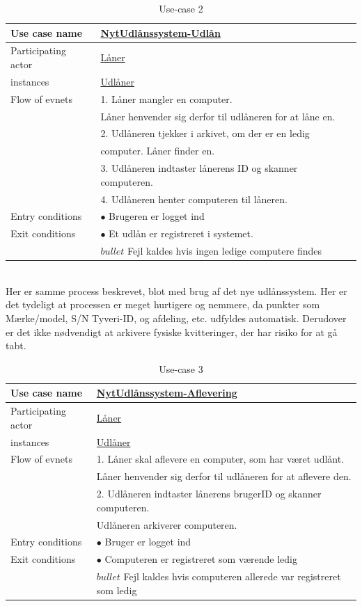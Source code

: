 \documentclass[a4paper]{article}
\begin{document}
\begin{table}[h]
\caption{Use-case 2}
\begin{tabular}{ll}
Use case name             & \underline{NytUdlånssystem-Udlån} \\ \hline
Participating actor           & \underline{Låner} \\
instances                     & \underline{Udlåner}\\ \hline
Flow of evnets                & 1. Låner mangler en computer.	\\& Låner henvender sig derfor til udlåneren for at låne en.
\\& 2. Udlåneren tjekker i arkivet, om der er en ledig \\& computer. Låner finder en.
\\& 3. Udlåneren indtaster lånerens ID og skanner computeren.
\\& 4. Udlåneren henter computeren til låneren.\\ \hline
Entry conditions & $\bullet$ Brugeren er logget ind \\ \hline
Exit conditions  & $\bullet$ Et udlån er registreret i systemet.\\
& $bullet$ Fejl kaldes hvis ingen ledige computere findes
\end{tabular}
\end{table}\\
Her er samme process beskrevet, blot med brug af det nye udlånssystem. Her er det tydeligt at processen er meget hurtigere og nemmere, da punkter som Mærke/model, S/N Tyveri-ID, og afdeling, etc. udfyldes automatisk. Derudover er det ikke nødvendigt at arkivere fysiske kvitteringer, der har risiko for at gå tabt.
\newpage
\begin{table}[h]
\caption{Use-case 3}
\begin{tabular}{ll}
Use case name               & \underline{NytUdlånssystem-Aflevering} \\ \hline
Participating actor           & \underline{Låner} \\
instances                     & \underline{Udlåner}\\ \hline
Flow of evnets                & 1. Låner skal aflevere en computer, som har været udlånt.
\\& Låner henvender sig derfor til udlåneren for at aflevere den.
\\& 2. Udlåneren indtaster lånerens brugerID og skanner computeren.
\\& Udlåneren arkiverer computeren. \\ \hline
Entry conditions & $\bullet$ Bruger er logget ind\\ \hline
Exit conditions  & $\bullet$ Computeren er registreret som værende ledig\\
& $bullet$ Fejl kaldes hvis computeren allerede var registreret som ledig
\end{tabular}
\end{table}
\end{document}
